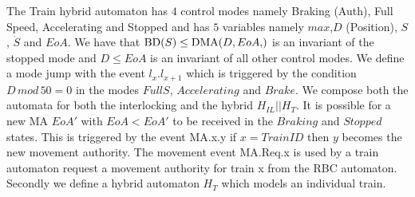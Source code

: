 The Train hybrid automaton has $4$ control modes namely Braking (Auth), Full Speed, Accelerating and Stopped and has $5$ variables namely $max$,$D$ (Position),  $S$, $\dot{S}$ and $EoA$. We have that $ \BD{S} \leq \DMA{D, EoA}$ is an invariant of the stopped mode and $D \leq EoA$ is an invariant of all other control modes.
We define a mode jump with the event $l_x.l_{x+1}$ which is triggered by the condition $D \, mod \, 50 = 0$ in the modes $Full S$, $Accelerating$ and $Brake$. 
   We compose both the automata for both the interlocking and the hybrid $H_{IL} || H_{T}$. It is possible for a new MA $EoA'$ with $EoA < EoA'$ to be received in the $Braking$ and $Stopped$ states.  This is triggered by the event MA.x.y if $x = TrainID$ then $y$ becomes the new movement authority. The movement event MA.Req.x is used by a train automaton request a movement authority for train x from the RBC automaton. Secondly we define a hybrid automaton $H_{T}$ which models an individual train. 
\medskip
